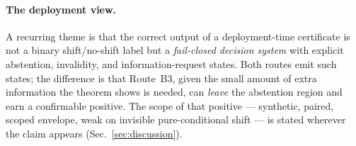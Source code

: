 \paragraph{The deployment view.}
A recurring theme is that the correct output of a deployment-time certificate is not a binary shift/no-shift
label but a \emph{fail-closed decision system} with explicit abstention, invalidity, and
information-request states. Both routes emit such states; the difference is that Route~B3, given the small
amount of extra information the theorem shows is needed, can \emph{leave} the abstention region and earn a confirmable
positive. The scope of that positive --- synthetic, paired, scoped envelope, weak on invisible
pure-conditional shift --- is stated wherever the claim appears (Sec.~\ref{sec:discussion}).
